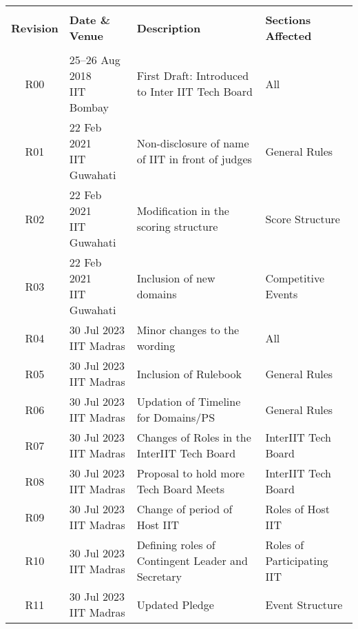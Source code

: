 \begin{center}
\renewcommand\cellgape{\Gape[2pt]} %
\begin{longtable}{c m{3.2cm} m{6.2cm} m{3.5cm}}
\hline
\\[-3pt]
\textbf{Revision} & \textbf{Date \& Venue} & \textbf{Description} & \textbf{Sections Affected} \\[4pt]
\hline
\\[-1pt]
R00 & \makecell[l]{25--26 Aug 2018\\ IIT Bombay} & First Draft: Introduced to Inter IIT Tech Board & All \\
R01 & \makecell[l]{22 Feb 2021\\ IIT Guwahati} & Non-disclosure of name of IIT in front of judges & General Rules \\
R02 & \makecell[l]{22 Feb 2021\\ IIT Guwahati} & Modification in the scoring structure & Score Structure \\
R03 & \makecell[l]{22 Feb 2021\\ IIT Guwahati} & Inclusion of new domains & Competitive Events \\
R04 & \makecell[l]{30 Jul 2023\\ IIT Madras} & Minor changes to the wording & All \\
R05 & \makecell[l]{30 Jul 2023\\ IIT Madras} & Inclusion of Rulebook & General Rules \\
R06 & \makecell[l]{30 Jul 2023\\ IIT Madras} & Updation of Timeline for Domains/PS & General Rules \\
R07 & \makecell[l]{30 Jul 2023\\ IIT Madras} & Changes of Roles in the InterIIT Tech Board & InterIIT Tech Board \\
R08 & \makecell[l]{30 Jul 2023\\ IIT Madras} & Proposal to hold more Tech Board Meets & InterIIT Tech Board \\
R09 & \makecell[l]{30 Jul 2023\\ IIT Madras} & Change of period of Host IIT & Roles of Host IIT \\
R10 & \makecell[l]{30 Jul 2023\\ IIT Madras} & Defining roles of Contingent Leader and Secretary & Roles of Participating IIT \\
R11 & \makecell[l]{30 Jul 2023\\ IIT Madras} & Updated Pledge & Event Structure \\

\end{longtable}
\end{center}
